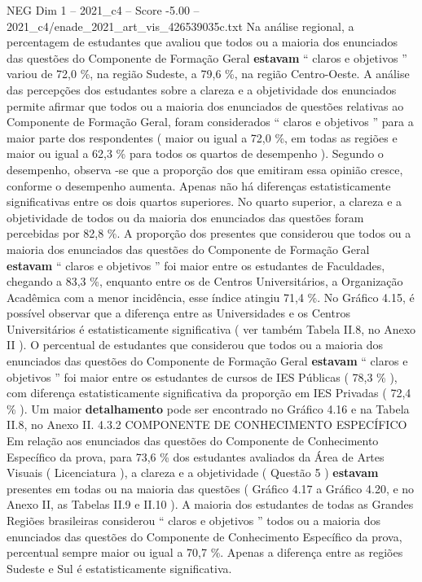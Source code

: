 \begin{textsample}{NEG Dim 1 – 2021\_c4 – Score -5.00 – 2021\_c4/enade\_2021\_art\_vis\_426539035c.txt}
Na análise regional, a percentagem de estudantes que avaliou que todos ou a maioria dos enunciados das questões do Componente de Formação Geral \textbf{estavam} “ claros e objetivos ” variou de 72,0 \%, na região Sudeste, a 79,6 \%, na região Centro-Oeste.
A análise das percepções dos estudantes sobre a clareza e a objetividade dos enunciados permite afirmar que todos ou a maioria dos enunciados de questões relativas ao Componente de Formação Geral, foram considerados “ claros e objetivos ” para a maior parte dos respondentes ( maior ou igual a 72,0 \%, em todas as regiões e maior ou igual a 62,3 \% para todos os quartos de desempenho ).
Segundo o desempenho, observa -se que a proporção dos que emitiram essa opinião cresce, conforme o desempenho aumenta.
Apenas não há diferenças estatisticamente significativas entre os dois quartos superiores.
No quarto superior, a clareza e a objetividade de todos ou da maioria dos enunciados das questões foram percebidas por 82,8 \%.
A proporção dos presentes que considerou que todos ou a maioria dos enunciados das questões do Componente de Formação Geral \textbf{estavam} “ claros e objetivos ” foi maior entre os estudantes de Faculdades, chegando a 83,3 \%, enquanto entre os de Centros Universitários, a Organização Acadêmica com a menor incidência, esse índice atingiu 71,4 \%.
No Gráfico 4.15, é possível observar que a diferença entre as Universidades e os Centros Universitários é estatisticamente significativa ( ver também Tabela II.8, no Anexo II ).
O percentual de estudantes que considerou que todos ou a maioria dos enunciados das questões do Componente de Formação Geral \textbf{estavam} “ claros e objetivos ” foi maior entre os estudantes de cursos de IES Públicas ( 78,3 \% ), com diferença estatisticamente significativa da proporção em IES Privadas ( 72,4 \% ).
Um maior \textbf{detalhamento} pode ser encontrado no Gráfico 4.16 e na Tabela II.8, no Anexo II. 4.3.2 COMPONENTE DE CONHECIMENTO ESPECÍFICO Em relação aos enunciados das questões do Componente de Conhecimento Específico da prova, para 73,6 \% dos estudantes avaliados da Área de Artes Visuais ( Licenciatura ), a clareza e a objetividade ( Questão 5 ) \textbf{estavam} presentes em todas ou na maioria das questões ( Gráfico 4.17 a Gráfico 4.20, e no Anexo II, as Tabelas II.9 e II.10 ).
A maioria dos estudantes de todas as Grandes Regiões brasileiras considerou “ claros e objetivos ” todos ou a maioria dos enunciados das questões do Componente de Conhecimento Específico da prova, percentual sempre maior ou igual a 70,7 \%.
Apenas a diferença entre as regiões Sudeste e Sul é estatisticamente significativa.

\end{textsample}
